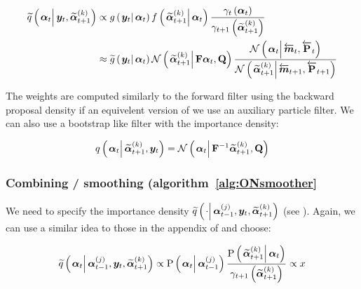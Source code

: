 \begin{equation}\begin{split}
	\IDAproxC{\vec{\alpha}_t}{\vec{y}_t, \particB{\vec{\alpha}}{t + 1}{k}} & \propto  
		\optorC{g}{\vec{y}_t}{\vec{\alpha}_t}
		\optorC{f}{\particB{\vec{\alpha}}{t + 1}{k}}{\vec{\alpha}_t}
		\frac{\gamma_t\Lparen{\vec{\alpha}_t}}{\gamma_{t + 1}\Lparen{\particB{\vec{\alpha}}{t + 1}{k}}} \\
%
	& \approx \optorC{\widetilde{g}}{\vec{y}_t}{\vec{\alpha}_t}
		\normalC{\particB{\vec{\alpha}}{t + 1}{k}}{\mat{F}\vec{\alpha}_t}{\mat{Q}}
		\frac{
			\normalC{\vec{\alpha}_t}{\vecLarrow{m}_t}{\matLarrow{P}_t}
		}{ %
			\normalC{\particB{\vec{\alpha}}{t + 1}{k}}{\vecLarrow{m}_{t + 1}}{\matLarrow{P}_{t + 1}}
		}
\end{split}\end{equation}

The weights are computed similarly to the forward filter using the backward proposal density if an equivelent version of we use an auxiliary particle filter. We can also use a bootstrap like filter with the importance density: 

\begin{equation}
	\IDC{\vec{\alpha}_t}{\particB{\vec{\alpha}}{t + 1}{k}, \vec{y}_t} = %
		\normalC{\vec{\alpha}_t}{\mat{F}^{-1}\particB{\vec{\alpha}}{t + 1}{k}}{\mat{Q}}
\end{equation}

\subsubsection*{Combining / smoothing (algorithm~\ref{alg:ONsmoother}}
We need to specify the importance density $\IDAproxC{\cdot}{\partic{\vec{\alpha}}{t-1}{j},\vec{y}_t, \particB{\vec{\alpha}}{t+1}{k}}$ (see \citet[page 453] {fearnhead10}). Again, we can use a similar idea to those in the appendix of \cite{fearnhead10} and choose:

\begin{equation}\begin{split}
	\IDAproxC{\vec{\alpha}_t}{\partic{\vec{\alpha}}{t-1}{j},\vec{y}_t, \particB{\vec{\alpha}}{t+1}{k}} \propto %
%
	\propC{\vec{\alpha}_t}{\partic{\vec{\alpha}}{t - 1}{j}}
	\frac{
		\propC{\particB{\vec{\alpha}}{t + 1}{k}}{\vec{\alpha}_t}
	}{
		\gamma_{t + 1}\Lparen{\particB{\vec{\alpha}}{t + 1}{k}}
	}
%
	\propto {x}
\end{split}\end{equation}

